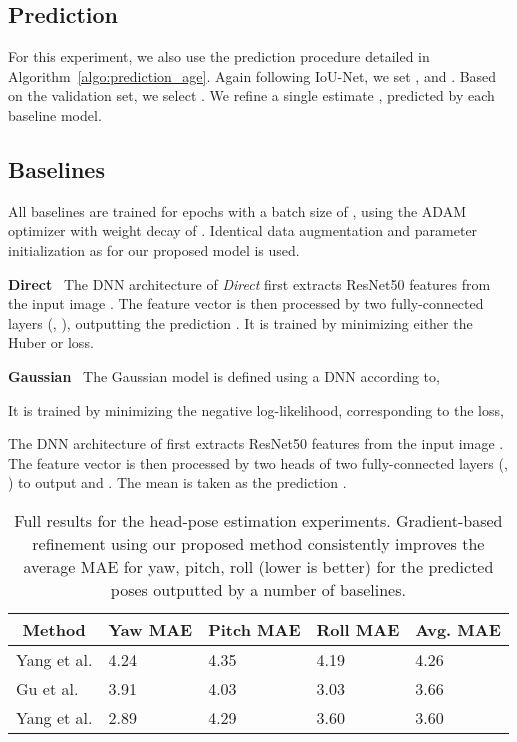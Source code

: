 \documentclass[runningheads]{llncs}
\newcommand{\parsection}[1]{\noindent\textbf{#1}~ }
\begin{document}
\begin{appendices}
\subsection{Prediction}
For this experiment, we also use the prediction procedure detailed in Algorithm~\ref{algo:prediction_age}. Again following IoU-Net, we set ,  and . Based on the validation set, we select . We refine a single estimate , predicted by each baseline model.



\subsection{Baselines}
All baselines are trained for  epochs with a batch size of , using the ADAM optimizer with weight decay of . Identical data augmentation and parameter initialization as for our proposed model is used.

\parsection{Direct}
The DNN architecture of \textit{Direct} first extracts ResNet50 features  from the input image . The feature vector  is then processed by two fully-connected layers (, ), outputting the prediction . It is trained by minimizing either the Huber or  loss.

\parsection{Gaussian}
The Gaussian model is defined using a DNN  according to,

It is trained by minimizing the negative log-likelihood, corresponding to the loss,

The DNN architecture of  first extracts ResNet50 features  from the input image . The feature vector  is then processed by two heads of two fully-connected layers (, ) to output  and . The mean  is taken as the prediction .

\begin{table*}[t]
\caption{Full results for the head-pose estimation experiments. Gradient-based refinement using our proposed method consistently improves the average MAE for yaw, pitch, roll (lower is better) for the predicted poses outputted by a number of baselines.}
\begin{center}
\begin{tabular}{|l||l|l|l|l|}
\multicolumn{1}{c}{Method} &\multicolumn{1}{c}{Yaw MAE} &\multicolumn{1}{c}{Pitch MAE} &\multicolumn{1}{c}{Roll MAE} &\multicolumn{1}{c}{Avg. MAE}\\ 
\hline

Yang et al. \cite{yang2018ssr}      &4.24    &4.35    &4.19    &4.26 \\
Gu et al. \cite{gu2017dynamic}         &3.91    &4.03    &3.03    &3.66 \\
Yang et al. \cite{yang2019fsa} &2.89    &4.29    &3.60    &3.60 \\



\end{tabular}
\end{center}
\end{table*}
\end{appendices}
\end{document}
